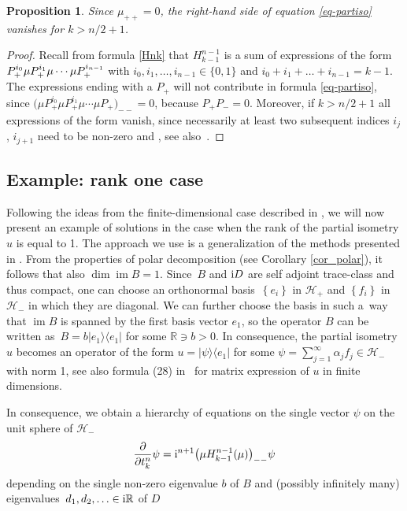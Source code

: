 \documentclass[10pt,a4paper]{amsart}
\newtheorem{prop}[thm]{Proposition}
\theoremstyle{definition}
\numberwithin{equation}{section}
\newcommand{\proj}[2]{|#1 \rangle \langle #2|}
\newcommand{\R}{\mathbb R}
\renewcommand{\H}{\mathcal{H}}
\DeclareMathOperator{\im}{im}
\newcommand{\set}[1]{\left\{#1\right\}}
\newcommand{\be}{\begin{equation}}
\newcommand{\ee}{\end{equation}}
\begin{document}
\begin{prop}\label{rem:limitk}
Since $\mu_{++}=0$, the right-hand side of equation \eqref{eq-partiso} vanishes for $k> n/2+1$.
\end{prop}

\begin{proof}
Recall from formula \eqref{Hnk} that $H^{n-1}_{k-1}$ is a sum of expressions of the form
$ P_+^{i_0}\mu P_+^{i_1}\mu\cdots \allowbreak\smash{\mu P_+^{i_{n-1}}}$
with $i_0, i_1, \dots, i_{n-1}\in\{0,1\}$ and $i_0+i_1+\dots+i_{n-1} = k-1$.
The expressions ending with a $P_+$ will not contribute in formula \eqref{eq-partiso}, since
$
\bigl(\mu P_+^{i_0}\mu P_+^{i_1}\mu\cdots \mu P_+\bigr)_{--} = 0$,
because $P_+ P_- = 0$.
Moreover, if $k> n/2+1$ all expressions of the form
vanish, since necessarily at least two subsequent indices $i_j$, $i_{j+1}$ need to be non-zero and ,
see also~\cite[Proposition~2]{GT-partiso-bial}.
\end{proof}

\subsection{Example: rank one case}\label{ex:rank1}

Following the ideas from the finite-dimensional case described in \cite{GT-partiso-bial}, we will now present an example of solutions in the case when the rank of the partial isometry $u$ is equal to 1. The approach we use is a generalization of the methods presented in \cite[Section 4]{GT-partiso-bial}. From the properties of polar decomposition (see Corollary \ref{cor_polar}), it follows that also $\dim\im B=1$.
Since~$B$ and ${\rm i}D$ are self adjoint trace-class and thus compact, one can choose an orthonormal basis~$\set{e_i}$ in $\H_+$ and $\set{f_i}$ in $\H_-$ in which they are diagonal.
We can further choose the basis in such a~way that $\im B$ is spanned by the first basis vector $e_1$, so the operator $B$ can be written as~${ B = b\proj{e_1}{e_1}}$
for some $\R\ni b>0$. In consequence, the partial isometry $u$ becomes an operator of the form
$u = \proj\psi{e_1}$
for some
$\psi = \sum_{j=1}^\infty \alpha_j f_j\in\H_-$
with norm 1, see also formula (28) in~\cite{GT-partiso-bial} for matrix expression of $u$ in finite dimensions.

In consequence, we obtain a hierarchy of equations on the single vector $\psi$ on the unit sphere of $\H_-$
\be \label{eq-partiso2} \frac\partial{\partial t^n_k} \psi = {\rm i}^{n+1}\bigl(\mu H^{n-1}_{k-1}(\mu)\bigr)_{--}\psi\ee
depending on the single non-zero eigenvalue $b$ of $B$ and (possibly infinitely many) eigenvalues~${d_1, d_2,\ldots\in {\rm i}\R}$ of $D$
\end{document}
